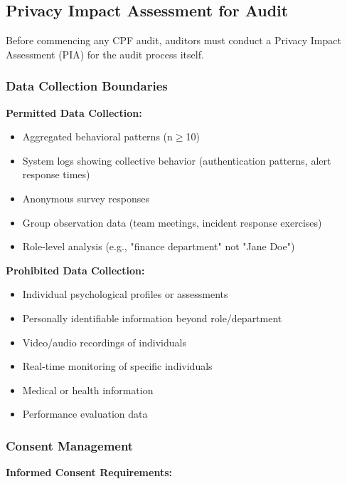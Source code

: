 \documentclass[11pt,a4paper]{article}
\begin{document}
\subsection{Privacy Impact Assessment for Audit}

Before commencing any CPF audit, auditors must conduct a Privacy Impact Assessment (PIA) for the audit process itself.

\subsubsection{Data Collection Boundaries}

\textbf{Permitted Data Collection:}
\begin{itemize}
\item Aggregated behavioral patterns (n$\geq$10)
\item System logs showing collective behavior (authentication patterns, alert response times)
\item Anonymous survey responses
\item Group observation data (team meetings, incident response exercises)
\item Role-level analysis (e.g., "finance department" not "Jane Doe")
\end{itemize}

\textbf{Prohibited Data Collection:}
\begin{itemize}
\item Individual psychological profiles or assessments
\item Personally identifiable information beyond role/department
\item Video/audio recordings of individuals
\item Real-time monitoring of specific individuals
\item Medical or health information
\item Performance evaluation data
\end{itemize}

\subsubsection{Consent Management}

\textbf{Informed Consent Requirements:}
\end{document}
